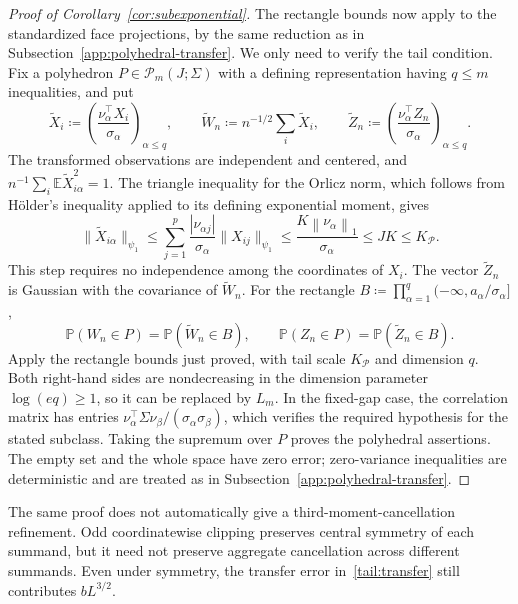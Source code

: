 \documentclass[11pt,letterpaper]{article}
\theoremstyle{remark}
\newcommand{\E}{\mathbb E}
\newcommand{\Pp}{\mathbb P}
\newcommand{\norm}[1]{\left\lVert#1\right\rVert}
\begin{document}
\begin{proof}[Proof of Corollary~\ref{cor:subexponential}]
The rectangle bounds now apply to the standardized face projections,
by the same reduction as in Subsection~\ref{app:polyhedral-transfer}.
We only need to verify the tail condition. Fix a polyhedron
\(P\in\mathcal P_m(J;\Sigma)\) with a defining representation
having \(q\le m\) inequalities, and put
\[
 \widetilde X_i\coloneqq
 \left(\frac{\nu_\alpha^\top X_i}{\sigma_\alpha}\right)_{\alpha\le q},
 \qquad \widetilde W_n\coloneqq n^{-1/2}\sum_i\widetilde X_i,
 \qquad \widetilde Z_n\coloneqq
 \left(\frac{\nu_\alpha^\top Z_n}{\sigma_\alpha}\right)_{\alpha\le q}.
\]
The transformed observations are independent and centered, and
\(n^{-1}\sum_i\E\widetilde X_{i\alpha}^2=1\).
The triangle inequality for the Orlicz norm, which follows from
H\"older's inequality applied to its defining exponential moment, gives
\[
 \|\widetilde X_{i\alpha}\|_{\psi_1}
 \le\sum_{j=1}^p\frac{|\nu_{\alpha j}|}{\sigma_\alpha}
                    \|X_{ij}\|_{\psi_1}
 \le\frac{K\norm{\nu_\alpha}_1}{\sigma_\alpha}
 \le JK\le K_{\mathcal P}.
\]
This step requires no independence among the coordinates of \(X_i\).
The vector \(\widetilde Z_n\) is Gaussian with the covariance of
\(\widetilde W_n\). For the rectangle
\(B\coloneqq\prod_{\alpha=1}^q(-\infty,a_\alpha/\sigma_\alpha]\),
\[
 \Pp(W_n\in P)=\Pp(\widetilde W_n\in B),\qquad
 \Pp(Z_n\in P)=\Pp(\widetilde Z_n\in B).
\]
Apply the rectangle bounds just proved, with tail scale
\(K_{\mathcal P}\) and dimension \(q\). Both right-hand sides are
nondecreasing in the dimension parameter \(\log(eq)\ge1\), so it
can be replaced by \(L_m\). In the fixed-gap case, the correlation
matrix has entries
\(\nu_\alpha^\top\Sigma\nu_\beta/(\sigma_\alpha\sigma_\beta)\),
which verifies the required hypothesis for the stated subclass.
Taking the supremum over \(P\) proves the polyhedral assertions.
The empty set and the whole space have zero error; zero-variance
inequalities are deterministic and are treated as in
Subsection~\ref{app:polyhedral-transfer}.
\end{proof}

The same proof does not automatically give a third-moment-cancellation
refinement. Odd coordinatewise clipping preserves central symmetry
of each summand, but it need not preserve aggregate cancellation
across different summands. Even under symmetry, the transfer error
in~\eqref{tail:transfer} still contributes \(bL^{3/2}\).
\end{document}
